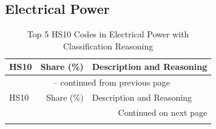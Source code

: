 \clearpage

\subsection{Electrical Power}

\begin{longtable}{lrp{12cm}}
\caption{Top 5 HS10 Codes in Electrical Power with Classification Reasoning}\\
\toprule
HS10 & Share (\%) & Description and Reasoning \\
\midrule
\endfirsthead

\multicolumn{3}{c}{{\tablename\ \thetable{} -- continued from previous page}} \\
\toprule
HS10 & Share (\%) & Description and Reasoning \\
\midrule
\endhead

\midrule
\multicolumn{3}{r}{{Continued on next page}} \\
\endfoot

\bottomrule
\endlastfoot


\end{longtable}
